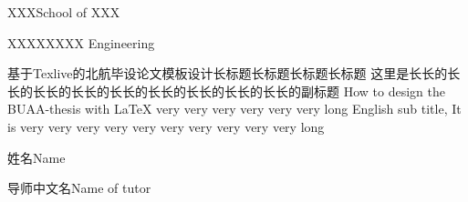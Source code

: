 
\school
{XXX}{School of XXX}

\major
{XXXX}{XXXX Engineering}

\thesistitle
{基于Texlive的北航毕设论文模板设计长标题长标题长标题长标题}
{这里是长长的长长的长长的长长的长长的长长的长长的长长的长长的副标题}
{How to design the BUAA-thesis with \LaTeX{} very very very very very very long}
{English sub title, It is very very very very very very very very very very long}

\thesisauthor
{姓名}{Name}

\teacher
{导师中文名}{Name of tutor}







